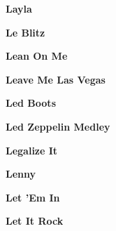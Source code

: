 \newline
\vspace{10pt} 
\begin{center}\textbf{Layla}\end{center}
\newline
\vspace{10pt} 
\begin{center}\textbf{Le Blitz}\end{center}
\newline
\vspace{10pt} 
\begin{center}\textbf{Lean On Me}\end{center}
\newline
\vspace{10pt} 
\begin{center}\textbf{Leave Me Las Vegas}\end{center}
\newline
\vspace{10pt} 
\begin{center}\textbf{Led Boots}\end{center}
\newline
\vspace{10pt} 
\begin{center}\textbf{Led Zeppelin Medley}\end{center}
\newline
\vspace{10pt} 
\begin{center}\textbf{Legalize It}\end{center}
\newline
\vspace{10pt} 
\begin{center}\textbf{Lenny}\end{center}
\newline
\vspace{10pt} 
\begin{center}\textbf{Let 'Em In}\end{center}
\newline
\vspace{10pt} 
\begin{center}\textbf{Let It Rock}\end{center}
